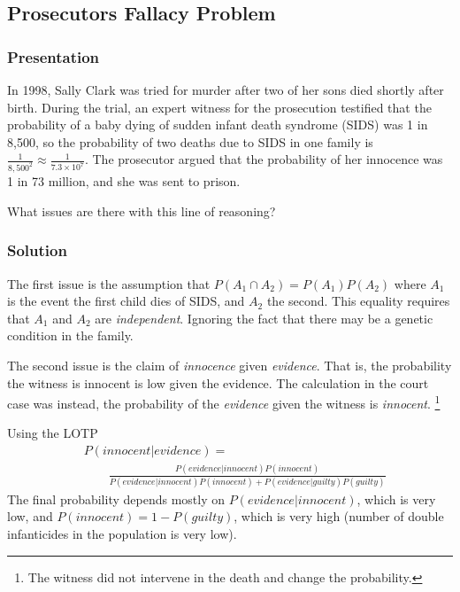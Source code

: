 \documentclass[11pt,a4paper]{article}
\begin{document}
\subsection{Prosecutors Fallacy Problem}

\subsubsection{Presentation}

In 1998, 
Sally Clark was tried for murder after two of her sons died shortly after birth. 
During the trial, 
an expert witness for the prosecution testified that the probability of a baby dying of sudden infant 
death syndrome (SIDS) was 1 in 8,500, 
so the probability of two deaths due to SIDS in one family is \(\frac{1}{{8,500}^{2}} \approx \frac{1}{7.3\times10^7}\). 
The prosecutor argued that the probability of her innocence was 1 in 73 million, 
and she was sent to prison.

What issues are there with this line of reasoning?

\clearpage
\subsubsection{Solution}

The first issue is the assumption that 
\(P\left( A_{1} \cap A_{2} \right) = P\left( A_{1} \right)P(A_{2})\)
where \(A_{1}\) is the event the first child dies of SIDS, and \(A_{2}\) the second. 
This equality requires that \(A_{1}\) and \(A_{2}\) are \emph{independent}. 
Ignoring the fact that there may be a genetic condition in the family.

The second issue is the claim of \emph{innocence} given \emph{evidence}.
That is, 
the probability the witness is innocent is low given the evidence. 
The calculation in the court case was instead, 
the probability of the \emph{evidence} given the witness is \emph{innocent}.%
\footnote{The witness did not intervene in the death and change the probability.}

Using the LOTP
\begin{equation}
\begin{split}
    & P\left( innocent | evidence \right) = \\
        & \qquad \frac{P\left( evidence | innocent \right)P(innocent)}{P\left( evidence | innocent  \right)P(innocent) + P(evidence|guilty)P(guilty)}
\end{split}
\end{equation}
The final probability depends mostly on \(P(evidence|innocent)\), 
which is very low, 
and \(P(innocent) = 1 - P(guilty)\), 
which is very high (number of double infanticides in the population is very low).
\end{document}
